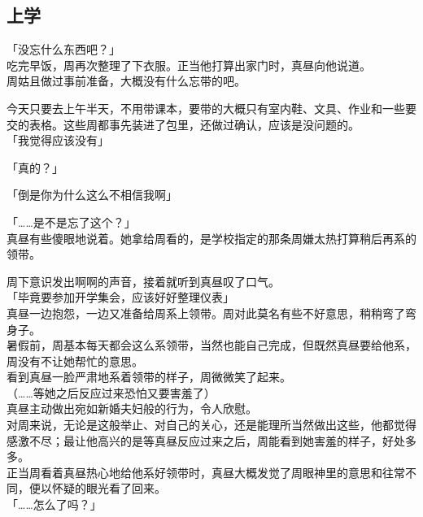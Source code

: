 \subsection{上学}

「没忘什么东西吧？」\\

吃完早饭，周再次整理了下衣服。正当他打算出家门时，真昼向他说道。\\

周姑且做过事前准备，大概没有什么忘带的吧。

今天只要去上午半天，不用带课本，要带的大概只有室内鞋、文具、作业和一些要交的表格。这些周都事先装进了包里，还做过确认，应该是没问题的。\\

「我觉得应该没有」

「真的？」

「倒是你为什么这么不相信我啊」

「……是不是忘了这个？」\\

真昼有些傻眼地说着。她拿给周看的，是学校指定的那条周嫌太热打算稍后再系的领带。

周下意识发出啊啊的声音，接着就听到真昼叹了口气。\\

「毕竟要参加开学集会，应该好好整理仪表」\\

真昼一边抱怨，一边又准备给周系上领带。周对此莫名有些不好意思，稍稍弯了弯身子。\\

暑假前，周基本每天都会这么系领带，当然也能自己完成，但既然真昼要给他系，周没有不让她帮忙的意思。\\

看到真昼一脸严肃地系着领带的样子，周微微笑了起来。\\

（……等她之后反应过来恐怕又要害羞了）\\

真昼主动做出宛如新婚夫妇般的行为，令人欣慰。\\

对周来说，无论是这般举止、对自己的关心，还是能理所当然做出这些，他都觉得感激不尽；最让他高兴的是等真昼反应过来之后，周能看到她害羞的样子，好处多多。\\

正当周看着真昼热心地给他系好领带时，真昼大概发觉了周眼神里的意思和往常不同，便以怀疑的眼光看了回来。\\

「……怎么了吗？」

